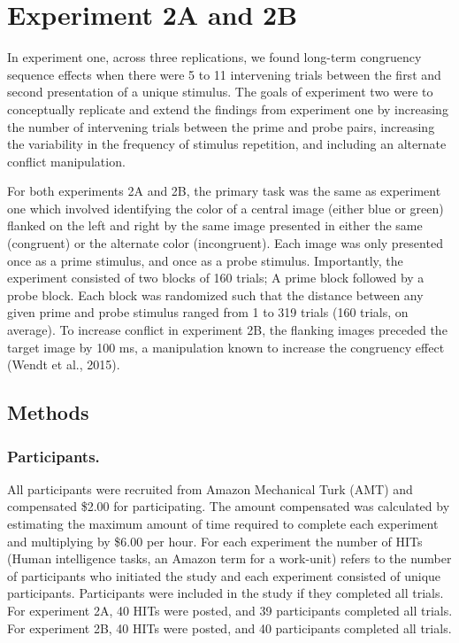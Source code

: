 \documentclass[]{DissertateCUNY}
\begin{document}
\hypertarget{experiment-2a-and-2b}{%
\section{Experiment 2A and 2B}\label{experiment-2a-and-2b}}

In experiment one, across three replications, we found long-term
congruency sequence effects when there were 5 to 11 intervening trials
between the first and second presentation of a unique stimulus. The
goals of experiment two were to conceptually replicate and extend the
findings from experiment one by increasing the number of intervening
trials between the prime and probe pairs, increasing the variability in
the frequency of stimulus repetition, and including an alternate
conflict manipulation.

For both experiments 2A and 2B, the primary task was the same as
experiment one which involved identifying the color of a central image
(either blue or green) flanked on the left and right by the same image
presented in either the same (congruent) or the alternate color
(incongruent). Each image was only presented once as a prime stimulus,
and once as a probe stimulus. Importantly, the experiment consisted of
two blocks of 160 trials; A prime block followed by a probe block. Each
block was randomized such that the distance between any given prime and
probe stimulus ranged from 1 to 319 trials (160 trials, on average). To
increase conflict in experiment 2B, the flanking images preceded the
target image by 100 ms, a manipulation known to increase the congruency
effect (Wendt et al., 2015).

\hypertarget{methods-5}{%
\subsection{Methods}\label{methods-5}}

\hypertarget{participants.-1}{%
\subsubsection{Participants.}\label{participants.-1}}

All participants were recruited from Amazon Mechanical Turk (AMT) and
compensated \$2.00 for participating. The amount compensated was
calculated by estimating the maximum amount of time required to complete
each experiment and multiplying by \$6.00 per hour. For each experiment
the number of HITs (Human intelligence tasks, an Amazon term for a
work-unit) refers to the number of participants who initiated the study
and each experiment consisted of unique participants. Participants were
included in the study if they completed all trials. For experiment 2A,
40 HITs were posted, and 39 participants completed all trials. For
experiment 2B, 40 HITs were posted, and 40 participants completed all
trials.
\end{document}
